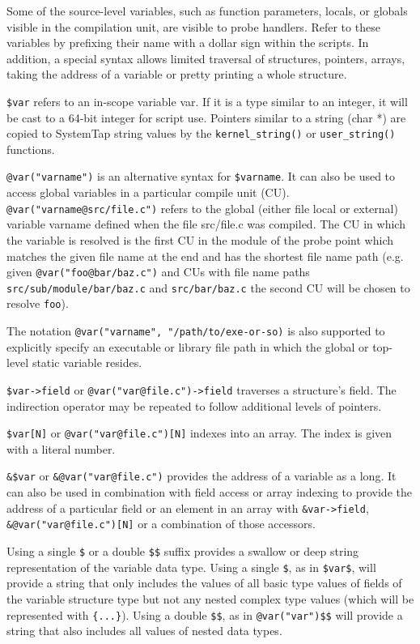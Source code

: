 \documentclass[twoside,english]{article}
\begin{document}
Some of the source-level variables, such as function parameters, locals,
or globals visible in the compilation unit, are visible to probe handlers.
Refer to these variables by prefixing their name with a dollar sign within
the scripts. In addition, a special syntax allows limited traversal of
structures, pointers, arrays, taking the address of a variable or pretty
printing a whole structure.

\texttt{\$var} refers to an in-scope variable var. If it is a type similar
to an integer, it will be cast to a 64-bit integer for script use. Pointers
similar to a string (char {*}) are copied to SystemTap string values by the
\texttt{kernel\_string()} or \texttt{user\_string()} functions.

\texttt{@var("varname")} is an alternative syntax for \texttt{\$varname}.
It can also be used to access global variables in a particular compile
unit (CU).  \texttt{@var("varname@src/file.c")} refers to the global
(either file local or external) variable varname defined when the file
src/file.c was compiled. The CU in which the variable is resolved is
the first CU in the module of the probe point which matches the given
file name at the end and has the shortest file name path (e.g. given
\texttt{@var("foo@bar/baz.c")} and CUs with file name paths
\texttt{src/sub/module/bar/baz.c} and \texttt{src/bar/baz.c} the second
CU will be chosen to resolve \texttt{foo}).

The notation \texttt{@var("varname", "/path/to/exe-or-so)} is also supported
to explicitly specify an executable or library file path in which the global or
top-level static variable resides.

\texttt{\$var->field} or \texttt{@var("var@file.c")->field} traverses a
structure's field. The indirection operator may be repeated to follow
additional levels of pointers.

\texttt{\$var{[}N]} or \texttt{@var("var@file.c"){[}N]} indexes into an
array. The index is given with a literal number.

\texttt{\&\$var} or \texttt{\&@var("var@file.c")} provides the address of
a variable as a long. It can also be used in combination with field access
or array indexing to provide the address of a particular field or an
element in an array with \texttt{\&var->field},
\texttt{\&@var("var@file.c"){[}N]} or a combination of those accessors.

Using a single \texttt{\$} or a double \texttt{\$\$} suffix provides a
swallow or deep string representation of the variable data type. Using
a single \texttt{\$}, as in \texttt{\$var\$}, will provide a string that
only includes the values of all basic type values of fields of the variable
structure type but not any nested complex type values (which will be
represented with \texttt{\{...\}}). Using a double \texttt{\$\$},
as in \texttt{@var("var")\$\$} will provide a string that also includes
all values of nested data types.
\end{document}
